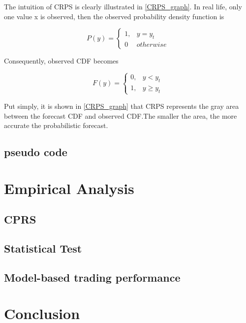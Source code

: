 \documentclass[12pt,a4paper]{article}
\newcommand\colorAutoref[1]{{\hypersetup{linkcolor=black}\autoref{#1}}}
\numberwithin{equation}{section}
\begin{document}
The intuition of CRPS is clearly illustrated in \colorAutoref{CRPS_graph}. In real life, only one value x is observed, then the observed probability density function is 

\begin{equation*}
P(y) = 
\begin{cases}
 1, & y = y_t \\
 0 & otherwise
\end{cases}
\end{equation*}

Consequently, observed CDF becomes

\begin{equation*}
F(y) = 
\begin{cases}
 0, & y < y_t \\
 1, & y \geq y_t
\end{cases}
\end{equation*}
 
Put simply, it is shown in \colorAutoref{CRPS_graph} that CRPS represents the gray area between the forecast CDF and observed CDF.The smaller the area, the more accurate the probabilistic forecast. 

\subsection{pseudo code}

\section{Empirical Analysis}

\subsection{CPRS}

\subsection{Statistical Test}

\subsection{Model-based trading performance}


\section{Conclusion}
\end{document}
